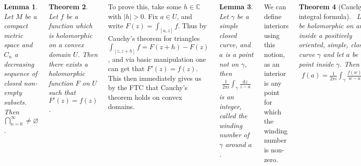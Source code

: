 \documentclass{tikzposter} %
\newtheorem{theorem}{Theorem}
\newtheorem{lemma}[theorem]{Lemma}
\begin{document}
\begin{columns}
{  \begin{lemma}
    Let $M$ be a compact metric space and $C_{n}$ a decreasing sequence of closed non-empty subsets. Then $\displaystyle \bigcap_{n=0}^{\infty} \neq \varnothing$.
  \end{lemma}
  \hphantom{}

  \begin{theorem}
    Let $f$ be a function which is holomorphic on a convex domain $U$. Then there exists a holomorphic function $F$ on $U$ such that $F'(z) = f(z)$.
  \end{theorem}
  \hphantom{}

  To prove this, take some $h \in \mathbb{C}$ with $|h| > 0$. Fix $a \in U$, and write $F(z) = \int_{[a,z]} f$. Thus by Cauchy's theorem for triangles $\int_{[z,z+h]} f = F(z+h) - F(z)$, and via basic manipulation one can get that $F'(z) = f(z)$. This then immediately gives us by the FTC that Cauchy's theorem holds on convex domains.

  \begin{lemma}
    Let $\gamma$ be a simple closed curve, and $a$ is a point not on $\gamma$, then
    \begin{align*}
      \frac{1}{2\pi i} \int_{\gamma} \frac{\mathrm{d}z}{z-a}
    \end{align*}
    is an integer, called the winding number of $\gamma$ around $a$.
  \end{lemma}
  \hphantom{}

  We can define interiors using this notion, as an interior is any point for which the winding number is non-zero. \\

  \begin{theorem}[Cauchy's integral formula]
  \ Let $f$ be holomorphic on and inside a positively oriented, simple, closed curve $\gamma$ and let $a$ be a point inside $\gamma$. Then
    \begin{align*}
      f(a) = \frac{1}{2\pi i} \int_{\gamma} \frac{f(w)}{w-a} \, \mathrm{d}w
    \end{align*}
  \end{theorem}
  \hphantom{}

  This is a slightly incredible result, because it indicates that the values which a holomorphic function takes on some boundary entirely determine its values on the interior. \\

}
\end{columns}
\end{document}
